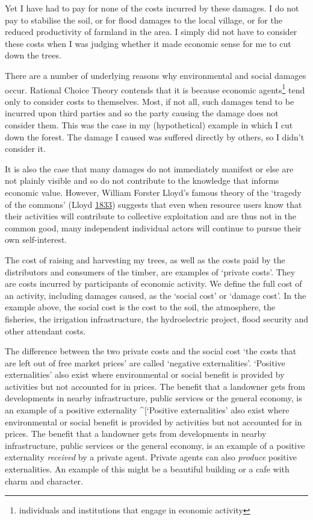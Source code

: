 \documentclass[]{tufte-handout}
\begin{document}
Yet I have had to pay for none of the costs incurred by these damages. I
do not pay to stabilise the soil, or for flood damages to the local
village, or for the reduced productivity of farmland in the area. I
simply did not have to consider these costs when I was judging whether
it made economic sense for me to cut down the trees.

There are a number of underlying reasons why environmental and social
damages occur. Rational Choice Theory contends that it is because
economic agents\footnote{individuals and institutions that engage in
  economic activity} tend only to consider costs to themselves. Most, if
not all, such damages tend to be incurred upon third parties and so the
party causing the damage does not consider them. This was the case in my
(hypothetical) example in which I cut down the forest. The damage I
caused was suffered directly by others, so I didn't consider it.

It is also the case that many damages do not immediately manifest or
else are not plainly visible and so do not contribute to the knowledge
that informs economic value. However, William Forster Lloyd's famous
theory of the `tragedy of the commons' (Lloyd
\protect\hyperlink{ref-Lloyd1833}{1833}) suggests that even when
resource users know that their activities will contribute to collective
exploitation and are thus not in the common good, many independent
individual actors will continue to pursue their own self-interest.

The cost of raising and harvesting my trees, as well as the costs paid
by the distributors and consumers of the timber, are examples of
`private costs'. They are costs incurred by participants of economic
activity. We define the full cost of an activity, including damages
caused, as the `social cost' or `damage cost'. In the example above, the
social cost is the cost to the soil, the atmosphere, the fisheries, the
irrigation infrastructure, the hydroelectric project, flood security and
other attendant costs.

The difference between the two private costs and the social cost `the
costs that are left out of free market prices' are called `negative
externalities'. `Positive externalities' also exist where environmental
or social benefit is provided by activities but not accounted for in
prices. The benefit that a landowner gets from developments in nearby
infrastructure, public services or the general economy, is an example of
a positive externality \^{}{[}`Positive externalities' also exist where
environmental or social benefit is provided by activities but not
accounted for in prices. The benefit that a landowner gets from
developments in nearby infrastructure, public services or the general
economy, is an example of a positive externality \emph{received} by a
private agent. Private agents can also \emph{produce} positive
externalities. An example of this might be a beautiful building or a
cafe with charm and character.
\end{document}
